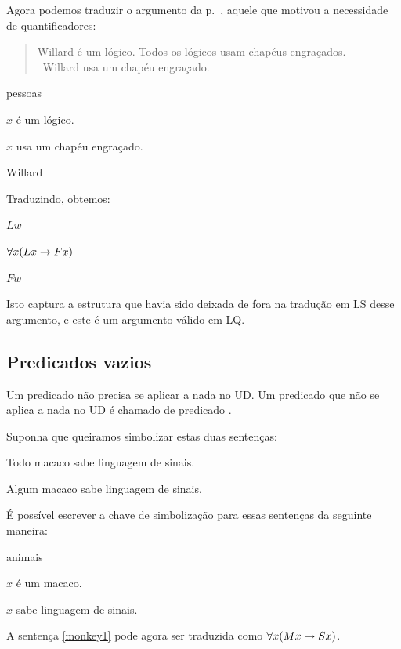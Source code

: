 Agora podemos traduzir o argumento da p.~\pageref{willard1}, aquele que motivou a necessidade de quantificadores:
\begin{quote}
Willard é um lógico. Todos os lógicos usam chapéus engraçados.\\
\therefore\ Willard usa um chapéu engraçado.
\end{quote}
\begin{ekey}
\item[UD:] pessoas
\item[Lx:] $x$ é um lógico.
\item[Fx:] $x$ usa um chapéu engraçado.
\item[w:] Willard
\end{ekey}
Traduzindo, obtemos:
\begin{earg}
\item[] $Lw$
\item[] $\forall x(Lx \rightarrow Fx)$
\item[\therefore] $Fw$
\end{earg}

Isto captura a estrutura que havia sido deixada de fora na tradução em LS desse argumento, e este é um argumento válido em LQ.






\subsection{Predicados vazios}
Um predicado não precisa se aplicar a nada no UD. Um predicado que não se aplica a nada no UD é chamado de predicado .

Suponha que queiramos simbolizar estas duas sentenças:
\begin{earg}
\item[\ex{monkey1}] Todo macaco sabe linguagem de sinais.
\item[\ex{monkey2}] Algum macaco sabe linguagem de sinais.
\end{earg}
É possível escrever a chave de simbolização para essas sentenças da seguinte maneira:
\begin{ekey}
\item[UD:] animais
\item[Mx:] $x$ é um macaco.
\item[Sx:] $x$ sabe linguagem de sinais.
\end{ekey}

A sentença \ref{monkey1} pode agora ser traduzida como $\forall x(Mx \rightarrow Sx)$.


